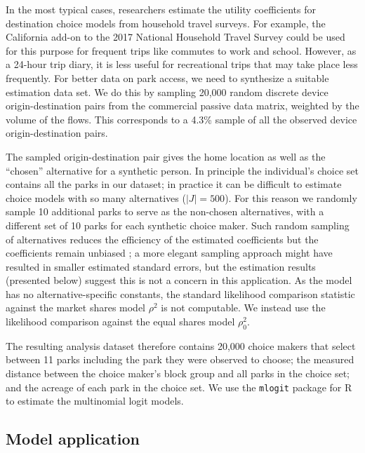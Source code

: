 \documentclass[3p, authoryear, review]{elsarticle} %
\begin{document}
In the most typical cases, researchers estimate the utility coefficients for
destination choice models from household travel surveys. For example, the
California add-on to the 2017 National Household Travel Survey could be used for
this purpose for frequent trips like commutes to work and school. However, as a
24-hour trip diary, it is less useful for recreational trips that may take place
less frequently. For better data on park access, we need to synthesize a
suitable estimation data set. We do this by sampling 20,000 random discrete
device origin-destination pairs from the commercial passive data matrix,
weighted by the volume of the flows. This corresponds to a
4.3\% sample of all the observed device
origin-destination pairs.

The sampled origin-destination pair gives the home location as well as the
``chosen'' alternative for a synthetic person. In principle the individual's
choice set contains all the parks in our dataset; in practice it can be
difficult to estimate choice models with so many alternatives (\(|J| = 500\)).
For this reason we randomly sample 10 additional parks
to serve as the non-chosen alternatives, with a different set of 10 parks for
each synthetic choice maker. Such
random sampling of alternatives reduces the efficiency of the estimated
coefficients but the coefficients remain unbiased \citep{train2009}; a more elegant
sampling approach might have resulted in smaller estimated standard errors,
but the estimation results (presented below) suggest this is not a concern in
this application. As the model has
no alternative-specific constants, the standard likelihood comparison statistic
against the market shares model \(\rho^2\) is not computable. We instead use the
likelihood comparison against the equal shares model \(\rho_0^2\).

The resulting analysis dataset therefore contains 20,000 choice makers that
select between 11 parks including the park they were observed to
choose; the measured distance between the choice maker's block group and all
parks in the choice set; and the acreage of each park in the choice set. We use
the \texttt{mlogit} package for R \citep{mlogit, R} to estimate the multinomial logit
models.

\hypertarget{model-application}{%
\subsection{Model application}\label{model-application}}
\end{document}
